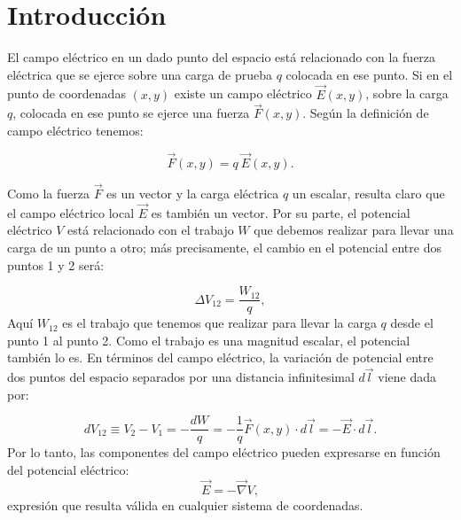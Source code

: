 \documentclass[epj]{svjour}
\begin{document}
 
\maketitle

\section{Introducci\'on}

El campo el\'ectrico en un dado punto del espacio est\'a relacionado con la fuerza
el\'ectrica que se ejerce sobre una carga de prueba $q$ colocada en ese punto. Si
en el punto de coordenadas $(x,y)$ existe un campo el\'ectrico $\vec{E}(x,y)$,
sobre la carga $q$, colocada en ese punto se ejerce una fuerza $\vec{F}(x,y)$.
Seg\'un la definici\'on de campo el\'ectrico tenemos:

\begin{equation} 
\vec{F}(x,y) = q \: \vec{E}(x,y).  
\end{equation}

Como la fuerza $\vec{F}$ es un vector y la carga el\'ectrica $q$ un escalar, resulta claro que el campo el\'ectrico local $\vec{E}$ es tambi\'en
un vector. Por su parte, el potencial el\'ectrico $V$ est\'a relacionado con el
trabajo $W$ que debemos realizar para llevar una carga de un punto a otro; m\'as
precisamente, el cambio en el potencial entre dos puntos 1 y 2 ser\'a: 

\begin{equation}
    \Delta V_{12} = \frac{W_{12}}{q},
\end{equation}
Aqu\'i $W_{12}$ es el trabajo que tenemos que realizar para llevar la
carga $q$ desde el punto 1 al punto 2. Como el trabajo es una magnitud escalar, el
potencial tambi\'en lo es. En t\'erminos del campo el\'ectrico, la variaci\'on de potencial entre dos puntos del espacio separados por una distancia infinitesimal $d\vec{l}$ viene dada por:

\begin{equation}
    dV_{12} \equiv V_2 - V_1 = - \frac{dW}{q} = - \frac{1}{q} \vec{F}(x,y)
    \cdot d\vec{l} = - \vec{E} \cdot d\vec{l}.
\end{equation}
Por lo tanto, las componentes del campo el\'ectrico pueden expresarse en funci\'on del potencial el\'ectrico:
\begin{equation}
    \vec{E} = - \vec{\nabla} V,
\end{equation}
expresi\'on que resulta v\'alida en cualquier sistema de coordenadas. 
\end{document}
